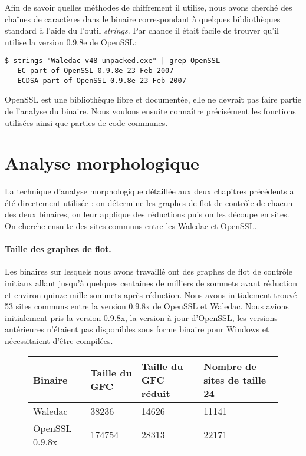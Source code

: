 Afin de savoir quelles méthodes de chiffrement il utilise, nous avons cherché des chaînes de caractères dans le binaire correspondant à quelques bibliothèques standard à l'aide du l'outil \emph{strings}.
Par chance il était facile de trouver qu'il utilise la version 0.9.8e de OpenSSL:
\begin{verbatim}
$ strings "Waledac v48 unpacked.exe" | grep OpenSSL
   EC part of OpenSSL 0.9.8e 23 Feb 2007
   ECDSA part of OpenSSL 0.9.8e 23 Feb 2007
\end{verbatim}

OpenSSL \cite{openssl} est une bibliothèque libre et documentée, elle ne devrait pas faire partie de l'analyse du binaire. Nous voulons ensuite connaître précisément les fonctions utilisées ainsi que parties de code communes.

\section{Analyse morphologique}
La technique d'analyse morphologique détaillée aux deux chapitres précédents a été directement utilisée : on détermine les graphes de flot de contrôle de chacun des deux binaires, on leur applique des réductions puis on les découpe en sites.
On cherche ensuite des sites communs entre les Waledac et OpenSSL.

\paragraph{Taille des graphes de flot.}
Les binaires sur lesquels nous avons travaillé ont des graphes de flot de contrôle initiaux allant jusqu'à quelques centaines de milliers de sommets avant réduction et environ quinze mille sommets après réduction. Nous avons initialement trouvé 53 sites communs entre la version 0.9.8x de OpenSSL et Waledac.
Nous avions initialement pris la version 0.9.8x, la version à jour d'OpenSSL, les versions antérieures n'étaient pas disponibles sous forme binaire pour Windows et nécessitaient d'être compilées.

\begin{figure}[h]
\begin{tabular}{|l|l|l|l|}
\hline
 Binaire & Taille du GFC & Taille du GFC réduit & Nombre de sites de taille 24 	\\
\hline
 Waledac &  38236 & 14626 & 11141					  	\\
\hline
 OpenSSL 0.9.8x  & 174754 & 28313 & 22171				  	\\
\hline
\end{tabular}
\end{figure}

